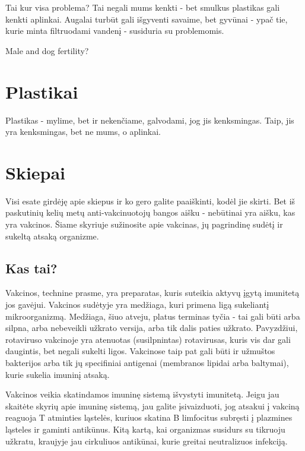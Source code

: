 \documentclass[]{book}
\begin{document}
Tai kur visa problema? Tai negali mums kenkti - bet smulkus plastikas gali kenkti aplinkai. Augalai turbūt gali išgyventi savaime, bet gyvūnai - ypač tie, kurie minta filtruodami vandenį - susiduria su problemomis.

Male and dog fertility?

\hypertarget{plastikai}{%
\chapter{Plastikai}\label{plastikai}}

Plastikas - mylime, bet ir nekenčiame, galvodami, jog jis kenksmingas. Taip, jis yra kenksmingas, bet ne mums, o aplinkai.

\hypertarget{skiepai-1}{%
\chapter{Skiepai}\label{skiepai-1}}

Visi esate girdėję apie skiepus ir ko gero galite paaiškinti, kodėl jie skirti. Bet iš paskutinių kelių metų anti-vakcinuotojų bangos aišku - nebūtinai yra aišku, kas yra vakcinos. Šiame skyriuje sužinosite apie vakcinas, jų pagrindinę sudėtį ir sukeltą atsaką organizme.

\hypertarget{kas-tai}{%
\section{Kas tai?}\label{kas-tai}}

Vakcinos, technine prasme, yra preparatas, kuris suteikia aktyvų įgytą imunitetą jos gavėjui. Vakcinos sudėtyje yra medžiaga, kuri primena ligą sukeliantį mikroorganizmą. Medžiaga, šiuo atveju, platus terminas tyčia - tai gali būti arba silpna, arba nebeveikli užkrato versija, arba tik dalis paties užkrato. Pavyzdžiui, rotaviruso vakcinoje yra atenuotas (susilpnintas) rotavirusas, kuris vis dar gali daugintis, bet negali sukelti ligos. Vakcinose taip pat gali būti ir užmuštos bakterijos arba tik jų specifiniai antigenai (membranos lipidai arba baltymai), kurie sukelia imuninį atsaką.

Vakcinos veikia skatindamos imuninę sistemą išvystyti imunitetą. Jeigu jau skaitėte skyrių apie imuninę sistemą, jau galite įsivaizduoti, jog atsakui į vakciną reaguoja T atminties ląstelės, kuriuos skatina B limfocitus subręsti į plazmines ląsteles ir gaminti antikūnus. Kitą kartą, kai organizmas susidurs su tikruoju užkratu, kraujyje jau cirkuliuos antikūnai, kurie greitai neutralizuos infekciją.
\end{document}
